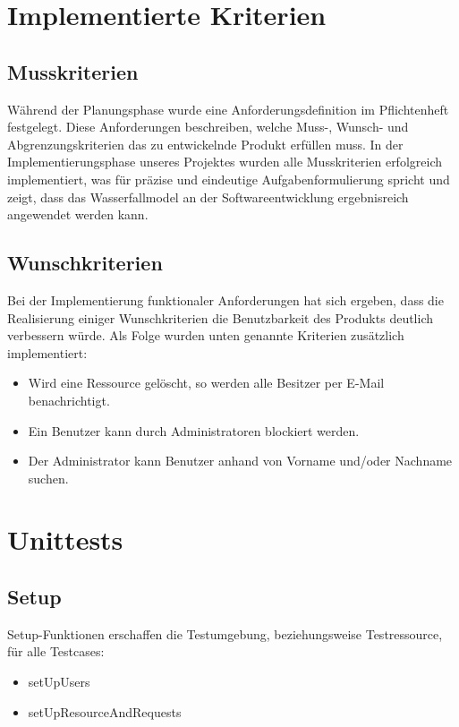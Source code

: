\documentclass[parskip=full,11pt]{scrartcl}
\begin{document}
\newpage
\section{Implementierte Kriterien}
\subsection{Musskriterien}
Während der Planungsphase wurde eine Anforderungsdefinition im Pflichtenheft festgelegt. Diese Anforderungen beschreiben, welche Muss-, Wunsch- und Abgrenzungskriterien das zu entwickelnde Produkt erfüllen muss. In der Implementierungsphase unseres Projektes wurden alle Musskriterien erfolgreich implementiert, was für präzise und eindeutige Aufgabenformulierung spricht und zeigt, dass das Wasserfallmodel an der Softwareentwicklung ergebnisreich angewendet werden kann.   

\subsection{Wunschkriterien}
Bei der Implementierung funktionaler Anforderungen hat sich ergeben, dass die Realisierung einiger Wunschkriterien die Benutzbarkeit des Produkts deutlich verbessern würde. Als Folge wurden unten genannte Kriterien zusätzlich implementiert:
\begin{itemize}
\item Wird eine Ressource gelöscht, so werden alle Besitzer per E-Mail benachrichtigt.
\item Ein Benutzer kann durch Administratoren blockiert werden.
\item Der Administrator kann Benutzer anhand von Vorname und/oder Nachname suchen.
\end{itemize}


\newpage
\section*{Unittests}
\subsection*{Setup}
Setup-Funktionen erschaffen die Testumgebung, beziehungsweise Testressource, für alle Testcases:
\begin{itemize}
\item setUpUsers
\item setUpResourceAndRequests
\end{itemize}
\end{document}

